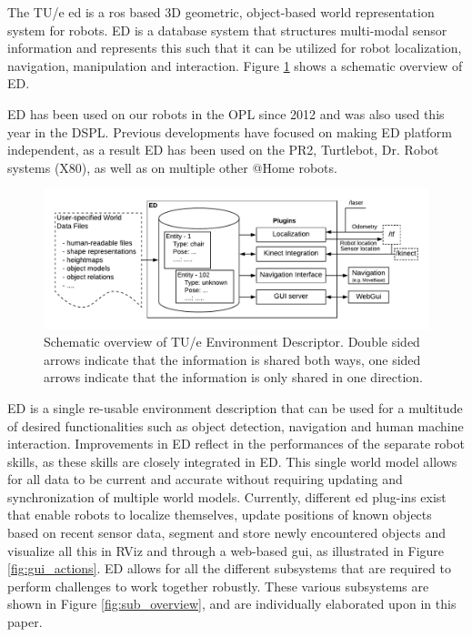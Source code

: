 \label{sec:ed}
The TU/e \acrfull{ed} is a \acrfull{ros} based 3D geometric, object-based world representation system for robots. ED is a database system that structures multi-modal sensor information and represents this such that it can be utilized for robot localization, navigation, manipulation and interaction. Figure \ref{fig:ed} shows a schematic overview of ED.

ED has been used on our robots in the OPL since 2012 and was also used this year in the DSPL. Previous developments have focused on making ED platform independent, as a result ED has been used on the PR2, Turtlebot, Dr. Robot systems (X80), as well as on multiple other @Home robots.\\
\begin{figure}[H]
	\vspace{-0.5cm}
    \centering
	\includegraphics[width=\linewidth]{Figures/ed_overview}
    \vspace{-1em}
	\caption{Schematic overview of TU/e Environment Descriptor. Double sided arrows indicate that the information is shared both ways, one sided arrows indicate that the information is only shared in one direction.}
	\label{fig:ed}
    \vspace{-0.3cm}
\end{figure}
\newpage
\noindent ED is a single re-usable environment description that can be used for a multitude of desired functionalities such as object detection, navigation and human machine interaction. Improvements in ED reflect in the performances of the separate robot skills, as these skills are closely integrated in ED. This single world model allows for all data to be current and accurate without requiring updating and synchronization of multiple world models. Currently, different \acrshort{ed} plug-ins exist that enable robots to localize themselves, update positions of known objects based on recent sensor data, segment and store newly encountered objects and visualize all this in RViz and through a web-based \acrshort{gui}, as illustrated in Figure \ref{fig:gui_actions}. ED allows for all the different subsystems that are required to perform challenges to work together robustly. These various subsystems are shown in Figure \ref{fig:sub_overview}, and are individually elaborated upon in this paper. 
